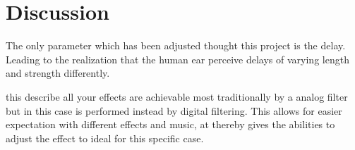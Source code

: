 
\section{Discussion}
The only parameter which has been adjusted thought this project is the delay. Leading to the realization that the human ear perceive delays of varying length and strength differently. 

this describe all your effects are achievable most traditionally by a analog filter but in this case is performed instead by digital filtering.
This allows for easier expectation with different effects and music, at thereby gives the abilities to adjust the effect to ideal for this specific case.


